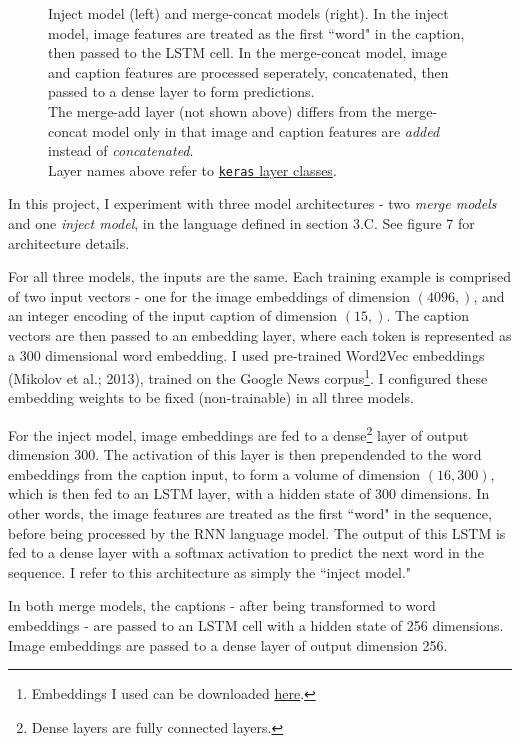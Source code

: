 \documentclass[letterpaper, 10 pt, conference]{ieeeconf}
\begin{document}
\begin{figure}[h]
\begin{minipage}{.5\textwidth}
  \label{fig:test2}
\end{minipage}
\caption{Inject model (left) and merge-concat models (right). In the inject model, image features are treated as the first ``word" in the caption, then passed to the LSTM cell. In the merge-concat model, image and caption features are processed seperately, concatenated, then passed to a dense layer to form predictions. \\
The merge-add layer (not shown above) differs from the merge-concat model only in that image and caption features are \textit{added} instead of \textit{concatenated}. \\
Layer names above refer to \href{https://keras.io/layers/about-keras-layers/}{\texttt{keras} layer classes}.}
\end{figure}

In this project, I experiment with three model architectures - two \textit{merge models} and one \textit{inject model}, in the language defined in section 3.C. See figure 7 for architecture details.

For all three models, the inputs are the same. Each training example is comprised of two input vectors - one for the image embeddings of dimension $(4096,)$, and an integer encoding of the input caption of dimension $(15,)$. The caption vectors are then passed to an embedding layer, where each token is represented as a 300 dimensional word embedding. I used pre-trained Word2Vec embeddings (Mikolov et al.; 2013), trained on the Google News corpus\footnote{Embeddings I used can be downloaded \href{https://github.com/mmihaltz/word2vec-GoogleNews-vectors}{here}.}. I configured these embedding weights to be fixed (non-trainable) in all three models. 

For the inject model, image embeddings are fed to a dense\footnote{Dense layers are fully connected layers.} layer of output dimension 300. The activation of this layer is then prependended to the word embeddings from the caption input, to form a volume of dimension $(16,300)$, which is then fed to an LSTM layer, with a hidden state of 300 dimensions. In other words, the image features are treated as the first ``word" in the sequence, before being processed by the RNN language model. The output of this LSTM is fed to a dense layer with a softmax activation to predict the next word in the sequence. I refer to this architecture as simply the ``inject model."

In both merge models, the captions - after being transformed to word embeddings - are passed to an LSTM cell  with a hidden state of 256 dimensions. Image embeddings are passed to a dense layer of output dimension 256. 
\end{document}
